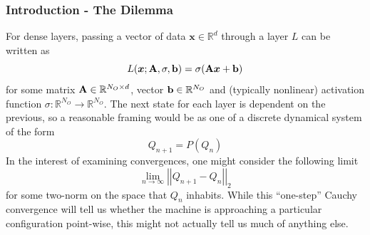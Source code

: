 \documentclass[11pt,aspectratio=169]{beamer}
\newcommand{\norm}[1]{\left|\left|#1\right|\right|}
\newcommand{\R}{\mathbb{R}}
\begin{document}
    \begin{frame}
        \frametitle{Introduction - The Dilemma}
        For dense layers, passing a vector of 
        data $\boldsymbol{x} \in \R^{d}$ through a layer $L$ can be written as 
        \begin{equation}
            L(\boldsymbol{x}; {\bf A}, \sigma, {\bf b}) = \sigma({\bf A}\boldsymbol{x} + {\bf b})
        \end{equation}
        for some matrix ${\bf A} \in \R^{N_O\times d}$, vector ${\bf b} \in \R^{N_O}$ and (typically nonlinear)
        activation function $\sigma: \R^{N_O} \to \R^{N_O}$. 
        The next state for each layer is dependent on the previous, so a reasonable 
        framing would be as one of a discrete dynamical system of the form
        \begin{equation}
            Q_{n+1} = P(Q_n)
        \end{equation}
        In the interest of examining 
        convergences, one might consider the following limit 
        \begin{equation}
            \lim_{n\to\infty} \norm{Q_{n+1} - Q_n}_2    
        \end{equation}
        for some two-norm on the space that $Q_n$ inhabits. While this ``one-step'' Cauchy 
        convergence will tell us whether the machine is approaching a particular configuration
        point-wise, this might not actually tell us much of anything else.
    \end{frame}

\end{document}
